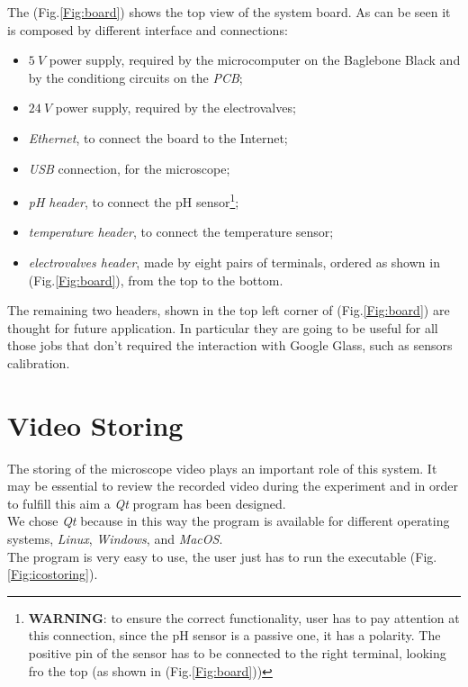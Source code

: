 The (Fig.\ref{Fig:board}) shows the top view of the system board. As can be seen it is composed by different interface and connections:
\begin{itemize}
	\item $5\ V$ power supply, required by the microcomputer on the Baglebone Black and by the conditiong circuits on the \textit{PCB};
	\item $24\ V$ power supply, required by the electrovalves;
	\item \textit{Ethernet}, to connect the board to the Internet;
	\item \textit{USB} connection, for the microscope;
	\item \textit{pH header}, to connect the pH sensor\footnote{\textbf{WARNING}: to ensure the correct functionality, user has to pay attention at this connection, since the pH sensor is a passive one, it has a polarity. The positive pin of the sensor has to be connected to the right terminal, looking fro the top (as shown in (Fig.\ref{Fig:board}))};
	\item \textit{temperature header}, to connect the temperature sensor;
	\item \textit{electrovalves header}, made by eight pairs of terminals, ordered as shown in (Fig.\ref{Fig:board}), from the top to the bottom.
\end{itemize}

The remaining two headers, shown in the top left corner of (Fig.\ref{Fig:board}) are thought for future application. In particular they are going to be useful for all those jobs that don't required the interaction with Google Glass, such as sensors calibration.

\section*{Video Storing}
The storing of the microscope video plays an important role of this system. It may be essential to review the recorded video  during the experiment and in order to fulfill this aim a \textit{Qt} program has been designed.\\
We chose \textit{Qt} because in this way the program is available for different operating systems, \textit{Linux}, \textit{Windows}, and \textit{MacOS}.\\

The program is very easy to use, the user just has to run the executable (Fig.\ref{Fig:icostoring}).

